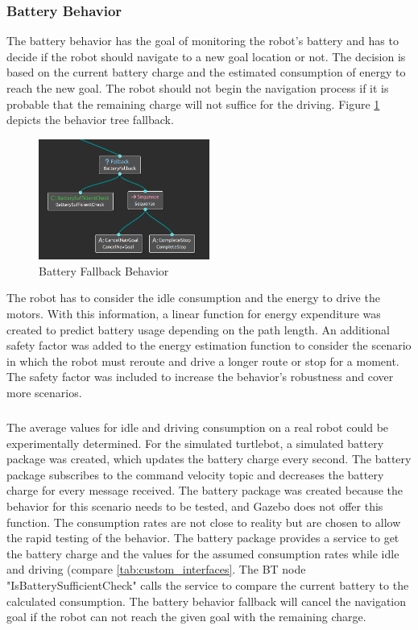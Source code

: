 \subsubsection{Battery Behavior}

The battery behavior has the goal of monitoring the robot's battery and has to decide if the robot should navigate to a new goal location or not. The decision is based on the current battery charge and the estimated consumption of energy to reach the new goal. The robot should not begin the navigation process if it is probable that the remaining charge will not suffice for the driving. Figure \ref{fig:battery_fallback} depicts the behavior tree fallback.

\begin{center}
\begin{figure}[ht]
	\includegraphics[width=0.5\textwidth]{images/battery_fallback.png}
	\caption{Battery Fallback Behavior}
	\label{fig:battery_fallback}
\end{figure}
\end{center}

The robot has to consider the idle consumption and the energy to drive the motors. With this information, a linear function for energy expenditure was created to predict battery usage depending on the path length. An additional safety factor was added to the energy estimation function to consider the scenario in which the robot must reroute and drive a longer route or stop for a moment. The safety factor was included to increase the behavior's robustness and cover more scenarios.
%
\subparagraph*{}

The average values for idle and driving consumption on a real robot could be experimentally determined. For the simulated turtlebot, a simulated battery package was created, which updates the battery charge every second. The battery package subscribes to the command velocity topic and decreases the battery charge for every message received. The battery package was created because the behavior for this scenario needs to be tested, and Gazebo does not offer this function. The consumption rates are not close to reality but are chosen to allow the rapid testing of the behavior.
The battery package provides a service to get the battery charge and the values for the assumed consumption rates while idle and driving (compare \ref{tab:custom_interfaces}. The BT node "IsBatterySufficientCheck" calls the service to compare the current battery to the calculated consumption. The battery behavior fallback will cancel the navigation goal if the robot can not reach the given goal with the remaining charge.

